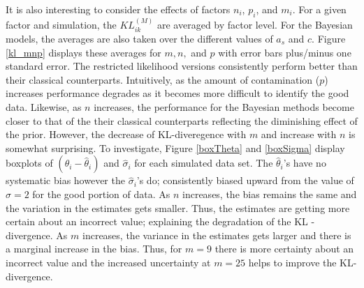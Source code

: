\documentclass[ba]{imsart}
\begin{document}
It is also interesting to consider the effects of factors $n_{i}$, $p_{i}$, and $m_{i}$. For a given factor and simulation, the $KL^{(M)}_{ik}$  are averaged by factor level. For the Bayesian models, the averages are also taken over the different values of $a_{s}$ and $c$. Figure \ref{kl_mnp} displays these averages for $m,n,$ and $p$ with error bars plus/minus one standard error. The restricted likelihood versions consistently perform better than their classical counterparts. Intuitively, as the amount of contamination ($p$) increases performance degrades as it becomes more difficult to identify the good data. Likewise, as $n$ increases, the performance for the Bayesian methods become closer to that of the their classical counterparts reflecting the diminishing effect of the prior. However, the decrease of KL-diveregence with $m$ and increase with $n$ is somewhat surprising. To investigate, Figure \ref{boxTheta} and \ref{boxSigma} display boxplots of $(\theta_{i} - \hat\theta_{i})$ and $\hat\sigma_{i}$ for each simulated data set. The $\hat\theta_{i}$'s have no systematic bias however the $\hat\sigma_{i}$'s do; consistently biased upward from the value of $\sigma = 2$ for the good portion of data. As $n$ increases, the bias remains the same and the variation in the estimates gets smaller. Thus, the estimates are getting more certain about an incorrect value; explaining the degradation of the KL - divergence. As $m$ increases, the variance in the estimates gets larger and there is a marginal increase in the bias. Thus, for $m=9$ there is more certainty about an incorrect value and  the increased uncertainty at $m=25$ helps to improve the KL-divergence. %
 
\end{document}
